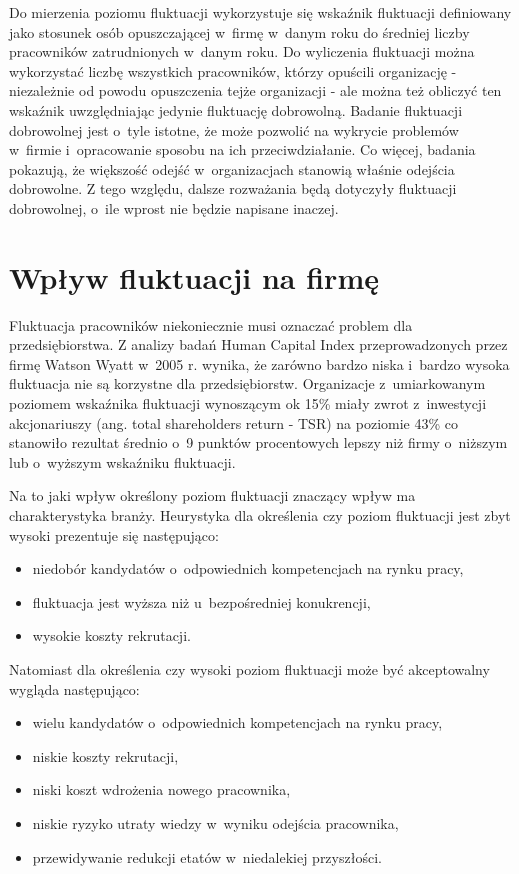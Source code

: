 Do mierzenia poziomu fluktuacji wykorzystuje się wskaźnik fluktuacji definiowany jako stosunek osób opuszczającej w~firmę w~danym roku do średniej liczby pracowników zatrudnionych w~danym roku.
Do wyliczenia fluktuacji można wykorzystać liczbę wszystkich pracowników, którzy opuścili organizację - niezależnie od powodu opuszczenia tejże organizacji - ale można też obliczyć ten wskaźnik uwzględniając jedynie fluktuację dobrowolną.
Badanie fluktuacji dobrowolnej jest o~tyle istotne, że może pozwolić na wykrycie problemów w~firmie i~opracowanie sposobu na ich przeciwdziałanie\cite{spychala-2019}.
Co więcej, badania pokazują, że większość odejść w~organizacjach stanowią właśnie odejścia dobrowolne\cite{dalton-1982}.
Z tego względu, dalsze rozważania będą dotyczyły fluktuacji dobrowolnej, o~ile wprost nie będzie napisane inaczej.


\section{Wpływ fluktuacji na firmę}\label{sec:wplyw-fluktuacji-na-firme}
Fluktuacja pracowników niekoniecznie musi oznaczać problem dla przedsiębiorstwa.
Z analizy badań Human Capital Index przeprowadzonych przez firmę Watson Wyatt w~2005 r. wynika,
że zarówno bardzo niska i~bardzo wysoka fluktuacja nie są korzystne dla przedsiębiorstw.
Organizacje z~umiarkowanym poziomem wskaźnika fluktuacji wynoszącym ok 15\%
miały zwrot z~inwestycji akcjonariuszy (ang. total shareholders return - TSR) na poziomie 43\%
co stanowiło rezultat średnio o~9 punktów procentowych lepszy niż firmy o~niższym lub o~wyższym wskaźniku fluktuacji\cite{krol-ludwiczynski-2006}.

Na to jaki wpływ określony poziom fluktuacji znaczący wpływ ma charakterystyka branży.\cite{taylor-2006}
Heurystyka dla określenia czy poziom fluktuacji jest zbyt wysoki prezentuje się następująco:
\begin{itemize}
    \item niedobór kandydatów o~odpowiednich kompetencjach na rynku pracy,
    \item fluktuacja jest wyższa niż u~bezpośredniej konukrencji,
    \item wysokie koszty rekrutacji.
\end{itemize}
Natomiast dla określenia czy wysoki poziom fluktuacji może być akceptowalny wygląda następująco:
\begin{itemize}
    \item wielu kandydatów o~odpowiednich kompetencjach na rynku pracy,
    \item niskie koszty rekrutacji,
    \item niski koszt wdrożenia nowego pracownika,
    \item niskie ryzyko utraty wiedzy w~wyniku odejścia pracownika,
    \item przewidywanie redukcji etatów w~niedalekiej przyszłości.
\end{itemize}


